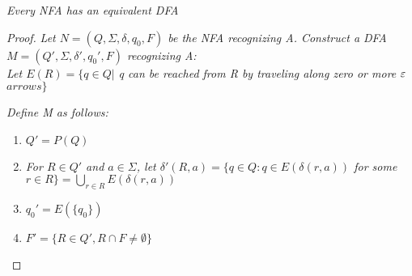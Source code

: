 \documentclass{article}
\begin{document}
\begin{thm}
    \textit{Every NFA has an equivalent DFA}

    \begin{proof}
          \textit{Let $N = (Q,\Sigma,\delta,q_0,F)$ be the NFA recognizing A. Construct a DFA $M = (Q',\Sigma,\delta',q_0',F)$ recognizing A:\\ Let $E(R) = \{q\in Q|$ q can be reached from R by traveling along zero or more $\varepsilon$ $ arrows\}$}

          \textit{Define M as follows:}

          \begin{enumerate}
            \item $Q' = P(Q)$
            \item \textit{For $R\in Q'$ and $a\in \Sigma$, let $\delta'(R,a) = \{q\in Q: q\in E(\delta(r,a))$ for some $r\in R\} = \bigcup_{r\in R} E(\delta(r,a))$}
            \item $q_0' = E(\{q_0\})$
            \item $F' = \{R\in Q',R\cap F \neq \emptyset\}$
          \end{enumerate}
    \end{proof}
\end{thm}
\end{document}
